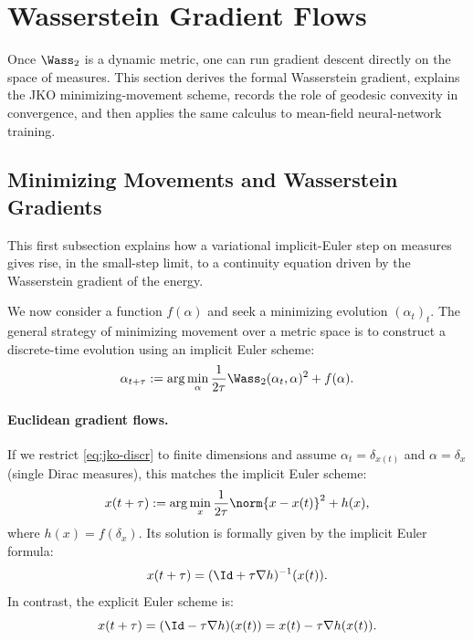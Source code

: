 
\section{Wasserstein Gradient Flows}
\label{sec-wasserstein-gradient-flows}

Once $\Wass_2$ is a dynamic metric, one can run gradient descent directly on the space of measures. This section derives the formal Wasserstein gradient, explains the JKO minimizing-movement scheme, records the role of geodesic convexity in convergence, and then applies the same calculus to mean-field neural-network training.

\subsection{Minimizing Movements and Wasserstein Gradients}

This first subsection explains how a variational implicit-Euler step on measures gives rise, in the small-step limit, to a continuity equation driven by the Wasserstein gradient of the energy.

We now consider a function $f(\alpha)$ and seek a minimizing evolution $(\alpha_t)_t$. The general strategy of minimizing movement over a metric space is to construct a discrete-time evolution using an implicit Euler scheme:
\begin{equation}
    \alpha_{t+\tau} := \arg\min_\alpha \frac{1}{2 \tau} \Wass_2(\alpha_t, \alpha)^2 + f(\alpha). \label{eq:jko-discr}
\end{equation}

\paragraph{Euclidean gradient flows.}

If we restrict \eqref{eq:jko-discr} to finite dimensions and assume $\alpha_t = \delta_{x(t)}$ and $\alpha = \delta_x$ (single Dirac measures), this matches the implicit Euler scheme:
\begin{equation*}
    x(t+\tau) := \arg\min_x \frac{1}{2 \tau} \norm{x - x(t)}^2 + h(x),
\end{equation*}
where $h(x) = f(\delta_x)$. Its solution is formally given by the implicit Euler formula:
\begin{equation*}
    x(t+\tau) = (\Id + \tau \nabla h)^{-1}(x(t)).
\end{equation*}
In contrast, the explicit Euler scheme is:
\begin{equation*}
    x(t+\tau) = (\Id - \tau \nabla h)(x(t)) = x(t) - \tau \nabla h(x(t)).
\end{equation*}

